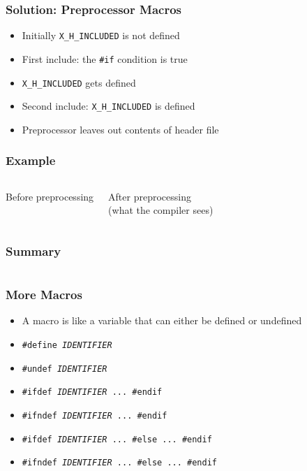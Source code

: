 \documentclass{../ucll-slides}
\begin{document}
\begin{frame}
  \frametitle{Solution: Preprocessor Macros}
  \begin{itemize}
    \item Initially {\tt X\_H\_INCLUDED} is not defined
    \item First include: the {\tt \#if} condition is true
    \item {\tt X\_H\_INCLUDED} gets defined
    \item Second include: {\tt X\_H\_INCLUDED} is defined
    \item Preprocessor leaves out contents of header file
  \end{itemize}
\end{frame}

\begin{frame}
  \frametitle{Example}
  \begin{columns}[t]
    \column{5cm}
    \begin{center} Before preprocessing \end{center}
    \column{5cm}
    \begin{center} After preprocessing \\ (what the compiler sees) \end{center}
    \vskip2cm
  \end{columns}
\end{frame}

\begin{frame}
  \frametitle{Summary}
  \begin{columns}
    \column{6cm}
    \column{6cm}
  \end{columns}
\end{frame}

\begin{frame}
  \frametitle{More Macros}
  \begin{itemize}
    \item A macro is like a variable
          that can either be defined or undefined
    \item {\tt \#define {\it IDENTIFIER}}
    \item {\tt \#undef {\it IDENTIFIER}}
    \item {\tt \#ifdef {\it IDENTIFIER} ... \#endif}
    \item {\tt \#ifndef {\it IDENTIFIER} ... \#endif}
    \item {\tt \#ifdef {\it IDENTIFIER} ... \#else ... \#endif}
    \item {\tt \#ifndef {\it IDENTIFIER} ... \#else ... \#endif}
  \end{itemize}
\end{frame}
\end{document}
